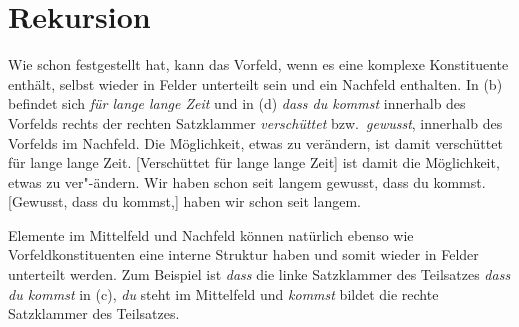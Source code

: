 \section{Rekursion}
\label{sec-topo-rekursion}

Wie schon \citet[]{Reis80a} festgestellt hat, kann das Vorfeld,
wenn es eine komplexe Konstituente enthält, selbst wieder
in Felder unterteilt sein und \zb ein Nachfeld enthalten.
In (b) befindet sich \emph{für lange lange Zeit} und in
(d) \emph{dass du kommst} innerhalb des Vorfelds rechts der
rechten Satzklammer \emph{verschüttet} bzw.\ \emph{gewusst}, \dash
innerhalb des Vorfelds im Nachfeld.
\eal
\ex Die Möglichkeit, etwas zu verändern, ist damit verschüttet
      für lange lange Zeit.
\ex {}[Verschüttet für lange lange Zeit] ist damit die Möglichkeit, 
      etwas zu ver"-ändern.
\ex Wir haben schon seit langem gewusst, dass du kommst.
\ex {}[Gewusst, dass du kommst,] haben wir schon seit langem.
\zl

\noindent
Elemente im Mittelfeld und Nachfeld können natürlich ebenso wie
Vorfeldkonstituenten eine interne Struktur haben und somit wieder
in Felder unterteilt werden. Zum Beispiel ist \emph{dass} die linke Satzklammer des Teilsatzes
\emph{dass du kommst} in (c), \emph{du} steht im Mittelfeld und \emph{kommst} bildet die
rechte Satzklammer des Teilsatzes.%






